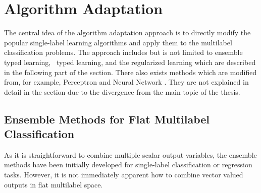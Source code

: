 {%
%
\section{Algorithm Adaptation}

The central idea of the algorithm adaptation approach is to directly modify the popular single-label learning algorithms and apply them to the multilabel classification problems.
The approach includes but is not limited to ensemble typed learning, \lr\ typed learning, and the regularized learning which are described in the following part of the section.
There also exists methods which are modified from, for example, Perceptron \citep{Crammer03afamily} and Neural Network \citep{Zhang06multilabel}.
They are not explained in detail in the section due to the divergence from the main topic of the thesis.



%
%
\subsection{Ensemble Methods for Flat Multilabel Classification} \label{sc_emfmlc}

As it is straightforward to combine multiple scalar output variables, the ensemble methods have been initially developed for single-label classification \citep{Breiman96bagging,Freund97a} or regression  \citep{Breiman96bagging} tasks.
However, it is not immediately apparent how to combine vector valued outputs in flat multilabel space.

}
